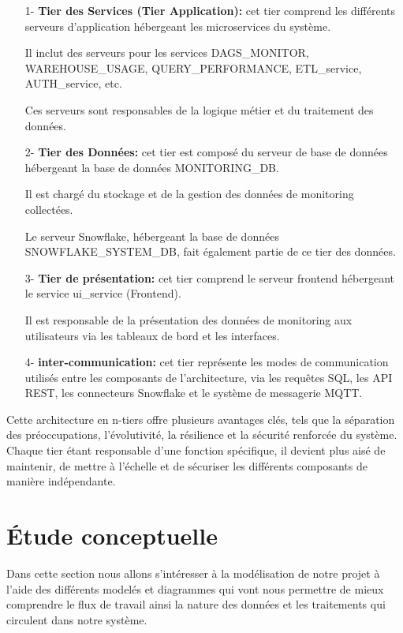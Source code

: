         \begin{enumerate}
            \item[1-] \textbf{Tier des Services (Tier Application): } 
            cet tier comprend les différents serveurs d'application hébergeant les microservices du système.
            \par Il inclut des serveurs pour les services DAGS\_MONITOR, WAREHOUSE\_USAGE, QUERY\_PERFORMANCE, ETL\_service, AUTH\_service, etc.
            \par Ces serveurs sont responsables de la logique métier et du traitement des données.
            \item [2-] \textbf{Tier des Données:} 
            cet tier est composé du serveur de base de données hébergeant la base de données MONITORING\_DB.
            \par Il est chargé du stockage et de la gestion des données de monitoring collectées.
            \par Le serveur Snowflake, hébergeant la base de données SNOWFLAKE\_SYSTEM\_DB, fait également partie de ce tier des données.
             
            \item[3-]  \textbf{Tier de présentation: }
            cet tier comprend le serveur frontend hébergeant le service ui\_service (Frontend).
            \par Il est responsable de la présentation des données de monitoring aux utilisateurs via les tableaux de bord et les interfaces.
            \item[4-] \textbf{inter-communication:}
            cet tier représente les modes de communication utilisés entre les composants de l'architecture, via les requêtes SQL, les API REST, les connecteurs Snowflake et le système de messagerie MQTT.

        \end{enumerate}
    \par Cette architecture en n-tiers offre plusieurs avantages clés, tels que la séparation des préoccupations, l'évolutivité, la résilience et la sécurité renforcée du système. 
    Chaque tier étant responsable d'une fonction spécifique, il devient plus aisé de maintenir, de mettre à l'échelle et de sécuriser les différents composants de manière indépendante.
\section{Étude conceptuelle}
\par Dans cette section nous allons s'intéresser à la modélisation de notre projet à l'aide des différents modelés et diagrammes qui vont nous permettre de mieux comprendre le flux de travail ainsi la nature des données et les traitements qui circulent dans notre système.
